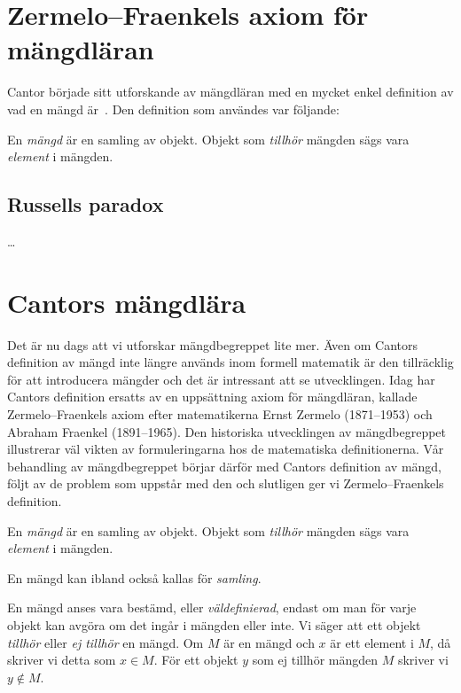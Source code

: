 \section{Zermelo--Fraenkels axiom för mängdläran}
\label{sec:Zermelo-Fraekel}
Cantor började sitt utforskande av mängdläran med en mycket enkel definition av 
vad en mängd är~\cite{Kline1990mtf3}.
Den definition som användes var följande:
\begin{definition}\label{CantorMangd}
  En \emph{mängd} är en samling av objekt.
  Objekt som \emph{tillhör} mängden sägs vara \emph{element} i mängden.
\end{definition}

\subsection{Russells paradox}
\label{sec:RusselsParadox}
\dots


\section{Cantors mängdlära}

Det är nu dags att vi utforskar mängdbegreppet lite mer.
Även om Cantors definition av mängd inte längre används inom formell matematik 
är den tillräcklig för att introducera mängder och det är intressant att se 
utvecklingen.
Idag har Cantors definition ersatts av en uppsättning axiom för mängdläran,
kallade Zermelo--Fraenkels axiom efter matematikerna Ernst Zermelo (1871--1953)
och Abraham Fraenkel (1891--1965).
Den historiska utvecklingen av mängdbegreppet illustrerar väl vikten av 
formuleringarna hos de matematiska definitionerna.
Vår behandling av mängdbegreppet börjar därför med Cantors definition av mängd, 
följt av de problem som uppstår med den och slutligen ger vi Zermelo--Fraenkels 
definition.

\begin{definition}\label{CantorMangd}
  En \emph{mängd} är en samling av objekt.
  Objekt som \emph{tillhör} mängden sägs vara \emph{element} i mängden.
\end{definition}
En mängd kan ibland också kallas för \emph{samling}.

En mängd anses vara bestämd, eller \emph{väldefinierad}, endast om man för
varje objekt kan avgöra om det ingår i mängden eller inte.
Vi säger att ett objekt \emph{tillhör} eller \emph{ej tillhör} en mängd.
Om \(M\) är en mängd och \(x\) är ett element i \(M\), då skriver vi detta som
\(x\in M\).
För ett objekt \(y\) som ej tillhör mängden \(M\) skriver vi \(y\notin M\).

